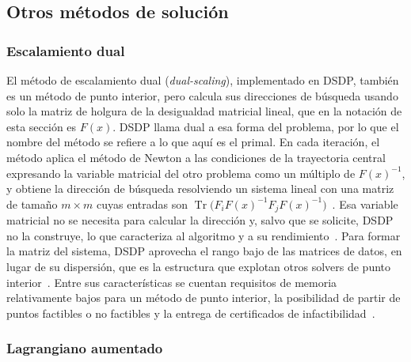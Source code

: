 \subsection{Otros métodos de solución}
\label{subsec:sdp_otros_metodos}

\subsubsection*{Escalamiento dual}

El método de escalamiento dual (\textit{dual-scaling}), implementado en DSDP, también es un método
de punto interior, pero calcula sus direcciones de búsqueda usando solo la matriz de holgura de la
desigualdad matricial lineal, que en la notación de esta sección es $F(x)$. DSDP llama dual a esa
forma del problema, por lo que el nombre del método se refiere a lo que aquí es el primal. En cada
iteración, el método aplica el método de Newton a las condiciones de la trayectoria central
expresando la variable matricial del otro problema como un múltiplo de $F(x)^{-1}$, y obtiene la
dirección de búsqueda resolviendo un sistema lineal con una matriz de tamaño $m \times m$ cuyas
entradas son
$\operatorname{Tr}\bigl(F_i F(x)^{-1} F_j F(x)^{-1}\bigr)$~\parencite[p.~16:4]{bensonAlgorithm875DSDP5software2008}.
Esa variable matricial no se necesita para calcular la dirección y, salvo que se solicite, DSDP no
la construye, lo que caracteriza al algoritmo y a su
rendimiento~\parencite[pp.~16:4--16:5]{bensonAlgorithm875DSDP5software2008}. Para formar la
matriz del sistema, DSDP aprovecha el rango bajo de las matrices de datos, en lugar de su
dispersión, que es la estructura que explotan otros solvers de punto
interior~\parencite[p.~16:5]{bensonAlgorithm875DSDP5software2008}. Entre sus características
se cuentan requisitos de memoria relativamente bajos para un método de punto interior, la
posibilidad de partir de puntos factibles o no factibles y la entrega de certificados de
infactibilidad~\parencite[p.~16:1]{bensonAlgorithm875DSDP5software2008}.

\subsubsection*{Lagrangiano aumentado}

